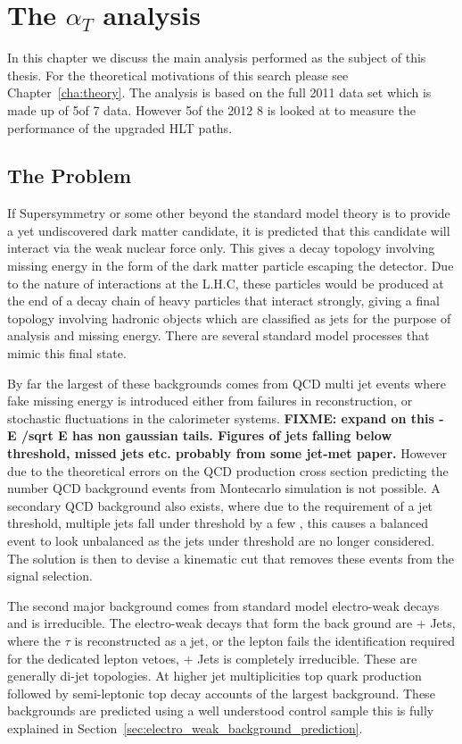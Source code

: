 \chapter{The $\alpha_{T}$ analysis} %
\label{cha:the_t_analysis}
In this chapter we discuss the main analysis performed as the subject of this 
thesis. For the theoretical motivations of this search please see 
Chapter~\ref{cha:theory}. The analysis is based on the full 2011 data set which is made up of 5\fbinv of 7 \TeV data. However 5\fbinv of the 2012 8 \TeV is looked at to measure the performance of the upgraded \alt HLT paths.
\section{The Problem} %
\label{sec:the_problem}
If Supersymmetry or some other beyond the standard model theory is to provide a 
yet undiscovered dark matter candidate, it is predicted that this candidate 
will interact via the weak nuclear force only. This gives a decay topology 
involving missing energy in the form of the dark matter particle escaping the 
detector. Due to the nature of interactions at the L.H.C, these particles would 
be produced at the end of a decay chain of heavy particles that interact 
strongly, giving a final topology involving hadronic objects which are 
classified as jets for the purpose of analysis and missing energy.
There are several standard model processes that mimic this final state.

By far the largest of these backgrounds comes from QCD multi jet events where 
fake missing energy is introduced either from failures in reconstruction, or 
stochastic fluctuations in the calorimeter systems.
\textbf{FIXME: expand on this - E /sqrt E has non gaussian tails. Figures of 
jets falling below threshold, missed jets etc. probably from some jet-met 
paper.}
However due to the theoretical errors on the QCD production cross section 
predicting the number QCD background events from Montecarlo simulation is not 
possible.
A secondary QCD background also exists, where due to the requirement of a jet 
\ET threshold, multiple jets fall under threshold by a few \GeV, this causes a 
balanced event to look unbalanced as the jets under threshold are no longer 
considered. The solution is then to devise a kinematic cut that removes these 
events from the signal selection.

The second major background comes from standard model electro-weak decays and 
is irreducible. The electro-weak decays that form the back ground are 
\HepProcess{\PW\to\Ptau\Pnu} + Jets, where the $\tau$ is reconstructed as a 
jet, or the lepton fails the identification required for the dedicated lepton 
vetoes, \HepProcess{\PZ\to\Pnu\APnu} + Jets is completely irreducible. These 
are generally di-jet topologies. At higher jet multiplicities top quark 
production followed by semi-leptonic top decay accounts of the largest 
background. These backgrounds are predicted using a well understood control 
sample this is fully explained in 
Section~\ref{sec:electro_weak_background_prediction}.


